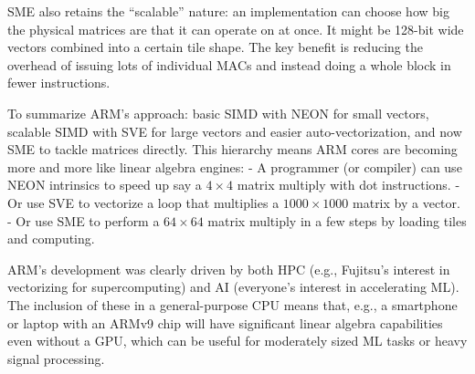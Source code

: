 SME also retains the “scalable” nature: an implementation can choose how big the physical matrices are that it can operate on at once. It might be 128-bit wide vectors combined into a certain tile shape. The key benefit is reducing the overhead of issuing lots of individual MACs and instead doing a whole block in fewer instructions.

To summarize ARM’s approach: basic SIMD with NEON for small vectors, scalable SIMD with SVE for large vectors and easier auto-vectorization, and now SME to tackle matrices directly. This hierarchy means ARM cores are becoming more and more like linear algebra engines:
- A programmer (or compiler) can use NEON intrinsics to speed up say a $4\times4$ matrix multiply with dot instructions.
- Or use SVE to vectorize a loop that multiplies a $1000\times1000$ matrix by a vector.
- Or use SME to perform a $64\times64$ matrix multiply in a few steps by loading tiles and computing.

ARM’s development was clearly driven by both HPC (e.g., Fujitsu’s interest in vectorizing for supercomputing) and AI (everyone’s interest in accelerating ML). The inclusion of these in a general-purpose CPU means that, e.g., a smartphone or laptop with an ARMv9 chip will have significant linear algebra capabilities even without a GPU, which can be useful for moderately sized ML tasks or heavy signal processing.

